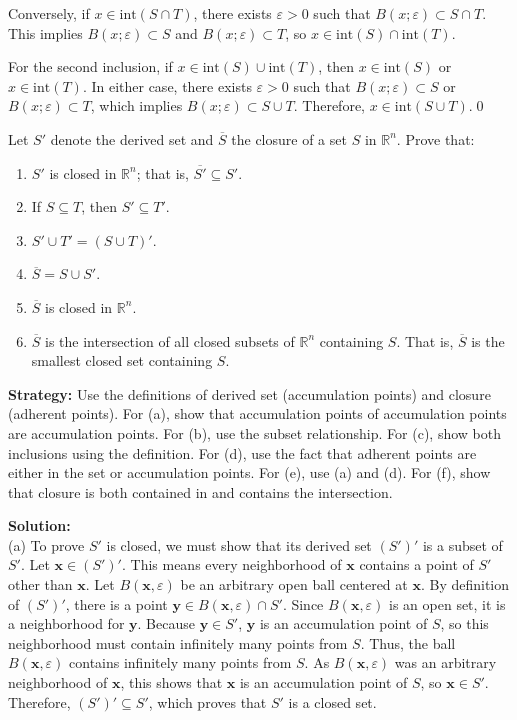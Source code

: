Conversely, if $x \in \text{int}(S \cap T)$, there exists $\varepsilon > 0$ such that $B(x;\varepsilon) \subset S \cap T$. This implies $B(x;\varepsilon) \subset S$ and $B(x;\varepsilon) \subset T$, so $x \in \text{int}(S) \cap \text{int}(T)$.

For the second inclusion, if $x \in \text{int}(S) \cup \text{int}(T)$, then $x \in \text{int}(S)$ or $x \in \text{int}(T)$. In either case, there exists $\varepsilon > 0$ such that $B(x;\varepsilon) \subset S$ or $B(x;\varepsilon) \subset T$, which implies $B(x;\varepsilon) \subset S \cup T$. Therefore, $x \in \text{int}(S \cup T)$.\qed


\begin{problembox}
Let $S'$ denote the derived set and $\overline{S}$ the closure of a set $S$ in $\mathbb{R}^n$. Prove that:
\begin{enumerate}[label=\alph*)]
\item $S'$ is closed in $\mathbb{R}^n$; that is, $\overline{S'} \subseteq S'$.
\item If $S \subseteq T$, then $S' \subseteq T'$.
\item $S' \cup T' = (S \cup T)'$.
\item $\overline{S} = S \cup S'$.
\item $\overline{S}$ is closed in $\mathbb{R}^n$.
\item $\overline{S}$ is the intersection of all closed subsets of $\mathbb{R}^n$ containing $S$. That is, $\overline{S}$ is the smallest closed set containing $S$.
\end{enumerate}
\end{problembox}

\noindent\textbf{Strategy:} Use the definitions of derived set (accumulation points) and closure (adherent points). For (a), show that accumulation points of accumulation points are accumulation points. For (b), use the subset relationship. For (c), show both inclusions using the definition. For (d), use the fact that adherent points are either in the set or accumulation points. For (e), use (a) and (d). For (f), show that closure is both contained in and contains the intersection.

\bigskip\noindent\textbf{Solution:}\\
(a) To prove $S'$ is closed, we must show that its derived set $(S')'$ is a subset of $S'$. Let $\mathbf{x} \in (S')'$. This means every neighborhood of $\mathbf{x}$ contains a point of $S'$ other than $\mathbf{x}$. Let $B(\mathbf{x}, \varepsilon)$ be an arbitrary open ball centered at $\mathbf{x}$. By definition of $(S')'$, there is a point $\mathbf{y} \in B(\mathbf{x}, \varepsilon) \cap S'$. Since $B(\mathbf{x}, \varepsilon)$ is an open set, it is a neighborhood for $\mathbf{y}$. Because $\mathbf{y} \in S'$, $\mathbf{y}$ is an accumulation point of $S$, so this neighborhood must contain infinitely many points from $S$. Thus, the ball $B(\mathbf{x}, \varepsilon)$ contains infinitely many points from $S$. As $B(\mathbf{x}, \varepsilon)$ was an arbitrary neighborhood of $\mathbf{x}$, this shows that $\mathbf{x}$ is an accumulation point of $S$, so $\mathbf{x} \in S'$. Therefore, $(S')' \subseteq S'$, which proves that $S'$ is a closed set.

